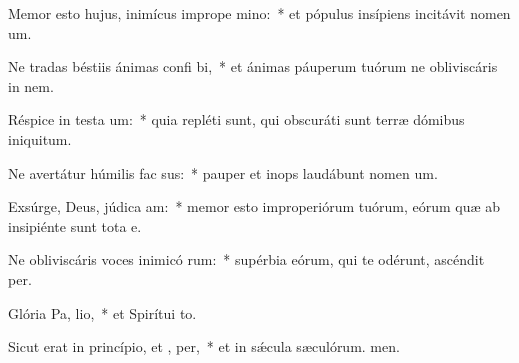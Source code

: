 \item Memor esto hujus, inimícus imprope mino:~* et pópulus insípiens incitávit nomen um.
\item Ne tradas béstiis ánimas confi bi,~* et ánimas páuperum tuórum ne obliviscáris in nem.
\item Réspice in testa um:~* quia repléti sunt, qui obscuráti sunt terræ dómibus iniquitum.
\item Ne avertátur húmilis fac sus:~* pauper et inops laudábunt nomen um.
\item Exsúrge, Deus, júdica  am:~* memor esto improperiórum tuórum, eórum quæ ab insipiénte sunt tota e.
\item Ne obliviscáris voces inimicó rum:~* supérbia eórum, qui te odérunt, ascéndit per.
\item Glória Pa,  lio,~* et Spirítui to.
\item Sicut erat in princípio, et ,  per,~* et in sǽcula sæculórum. men.
